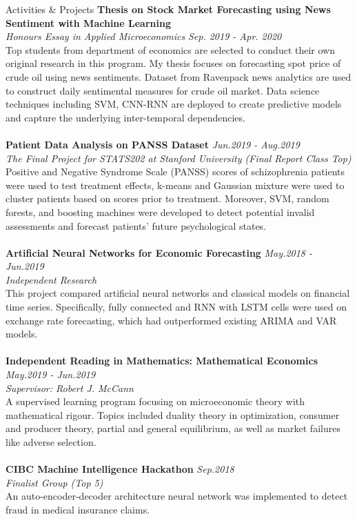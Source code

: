 \documentclass{resume} %
\begin{document}
\begin{rSection}{Activities \& Projects}
{\bf Thesis on Stock Market Forecasting using News Sentiment with Machine Learning}
\\ \emph{Honours Essay in Applied Microeconomics} \hfill \emph{Sep. 2019 - Apr. 2020}
\\ Top students from department of economics are selected to conduct their own original research in this program. My thesis focuses on forecasting spot price of crude oil using news sentiments. Dataset from Ravenpack news analytics are used to construct daily sentimental measures for crude oil market. Data science techniques including SVM, CNN-RNN are deployed to create predictive models and capture the underlying inter-temporal dependencies.
\\
\\
{\bf Patient Data Analysis on PANSS Dataset} \hfill \emph{Jun.2019 - Aug.2019}
\\ \emph{The Final Project for STATS202 at Stanford University (Final Report Class Top)}
\\ Positive and Negative Syndrome Scale (PANSS) scores of schizophrenia patients were used to test treatment effects, k-means and Gaussian mixture were used to cluster patients based on scores prior to treatment. Moreover, SVM, random forests, and boosting machines were developed to detect potential invalid assessments and forecast patients' future psychological states.
\\
\\{\bf Artificial Neural Networks for Economic Forecasting} \hfill \emph{May.2018 - Jun.2019}
\\ \emph{Independent Research}
\\ This project compared artificial neural networks and classical models on financial time series. Specifically, fully connected and RNN with LSTM cells were used on exchange rate forecasting, which had outperformed existing ARIMA and VAR models.
\\
\\{\bf Independent Reading in Mathematics: Mathematical Economics} \hfill \emph{May.2019 - Jun.2019}
\\ \emph{Supervisor: Robert J. McCann}
\\
A supervised learning program focusing on microeconomic theory with mathematical rigour. Topics included duality theory in optimization, consumer and producer theory, partial and general equilibrium, as well as market failures like adverse selection.
\\
\\{\bf CIBC Machine Intelligence Hackathon} \hfill \emph{Sep.2018}
\\ \emph{Finalist Group (Top 5)}
\\
An auto-encoder-decoder architecture neural network was implemented to detect fraud in medical insurance claims.
\\

\end{rSection}
\end{document}
